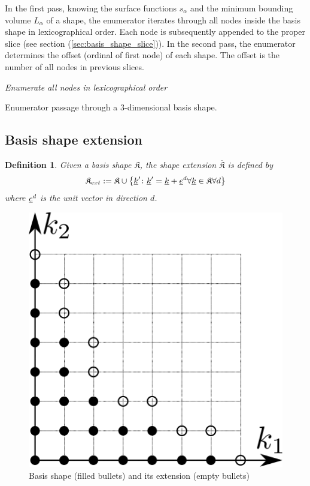\documentclass{article}
\newtheorem*{definition}{Definition}
\begin{document}
In the first pass, knowing the surface functions \(s_{\alpha}\)
and the minimum bounding volume \(L_{\alpha}\) of a shape,
the enumerator iterates through all nodes inside the basis shape in lexicographical order.
Each node is subsequently appended to the proper slice (see section (\ref{sec:basis_shape_slice})).
In the second pass, the enumerator determines the offset (ordinal of first node) of each shape.
The offset is the number of all nodes in previous slices.

\begin{algorithm}[H]
  \emph{Enumerate all nodes in lexicographical order}\;
  \caption{Enumerator passage through a 3-dimensional basis shape.}
\end{algorithm}

\subsection{Basis shape extension}

\begin{definition}
  Given a basis shape \( \mathfrak{K} \),
  the shape extension \( \overline{\mathfrak{K}} \) is defined by
  \begin{equation}
    \mathfrak{K}_{ext} := \mathfrak{K} \cup 
    \left\{\underline{k}' \colon \underline{k}' = \underline{k} + \underline{e}^d 
      \forall \underline{k} \in \mathfrak{K} \forall d\right\}
  \end{equation}
  where \( \underline{e}^d \) is the unit vector in direction \( d \).
\end{definition}

\begin{figure}[H]
  \begin{center}
    \includegraphics[width=0.5\linewidth]{shape_extension}
  \end{center}
  \caption{Basis shape (filled bullets) and its extension (empty
    bullets)}
\end{figure}
\end{document}
